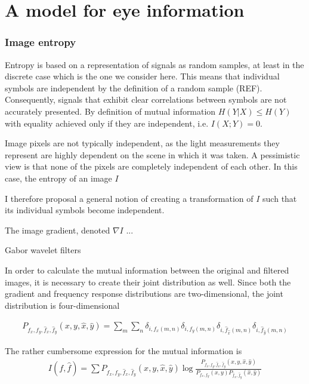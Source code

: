 \chapter{A model for eye information}
\subsection{Image entropy}
Entropy is based on a representation of signals as random samples, at least in the discrete case which is the one we consider here. This means that individual symbols are independent by the definition of a random sample (REF). Consequently, signals that exhibit clear correlations between symbols are not accurately presented. By definition of mutual information $H(Y|X) \leq H(Y)$ with equality achieved only if they are independent, i.e. $I(X;Y) = 0$. 

Image pixels are not typically independent, as the light measurements they represent are highly dependent on the scene in which it was taken. A pessimistic view is that none of the pixels are completely independent of each other. In this case, the entropy of an image $I$ 

I therefore proposal a general notion of creating a transformation of $I$ such that its individual symbols become independent. 

The image gradient, denoted $\nabla I$ ...

Gabor wavelet filters 

In order to calculate the mutual information between the original and filtered images, it is necessary to create their joint distribution as well. Since both the gradient and frequency response distributions are two-dimensional, the joint distribution is four-dimensional

\begin{multline}
    P_{f_x, f_y, \hat{f}_x, \hat{f}_y}(x, y, \hat{x}, \hat{y}) = \sum_m\sum_n \delta_{i, f_x(m, n)}\delta_{i, f_y(m, n)}\delta_{i, \hat{f}_{\hat{x}}(m, n)}\delta_{i, \hat{f}_{\hat{y}}(m, n)}
\end{multline}

The rather cumbersome expression for the mutual information is
\begin{multline}
    I(f, \hat{f}) = \sum P_{f_x, f_y, \hat{f}_x, \hat{f}_y}(x, y, \hat{x}, \hat{y}) \log \frac{P_{f_x, f_y, \hat{f}_x, \hat{f}_y}(x, y, \hat{x}, \hat{y})}{P_{f_x, f_y}(x, y)P_{\hat{f}_x, \hat{f}_y}(\hat{x}, \hat{y})}
\end{multline}

